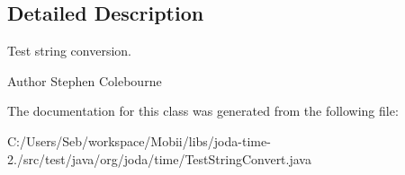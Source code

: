 \subsection{Detailed Description}
Test string conversion.

\begin{DoxyAuthor}{Author}
Stephen Colebourne 
\end{DoxyAuthor}


The documentation for this class was generated from the following file\-:\begin{DoxyCompactItemize}
\item 
C\-:/\-Users/\-Seb/workspace/\-Mobii/libs/joda-\/time-\/2./src/test/java/org/joda/time/Test\-String\-Convert.\-java\end{DoxyCompactItemize}

